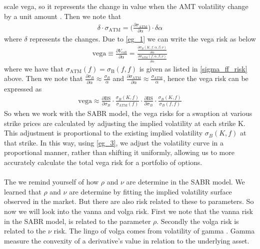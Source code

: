 scale vega, so it represents the change in value when the AMT volatility change by a unit amount \cite{Smile}.
Then we note that 
\begin{align}
    \delta  \cdot \sigma_{\text{ATM}} =
     \Big(\frac{\partial \sigma_{\text{ATM}}}{\partial \alpha} \Big) \cdot \delta \alpha \label{eg_1}
\end{align}
where $\delta$ represents the changes. Due to \autoref{eg_1} we can write the vega risk as below
\begin{align}
    \text{vega} \equiv  \frac{\partial V_{\text{call}}}{\partial \alpha} 
   = \frac{\frac{\partial \sigma_B(K, f; \alpha, \beta, \nu)}{\partial \alpha}}
    {\frac{\partial \sigma_{\text{ATM}}(f; \alpha, \beta, \nu)}{\partial \alpha}} \label{eg_3}
\end{align}
 where we have that $\sigma_{\text{ATM}}(f) = \sigma_{\text{B}} (f,f)$  is given as listed in \autoref{sigma_ff_risk}
 above. 
Then we note that  $\frac{\partial \sigma_B}{\partial \alpha} \approx \frac{ \sigma_B}{ \alpha}$ 
and $\frac{\partial \sigma_{\text{ATM}}}{\partial \alpha} \approx \frac{ \sigma_{\text{ATM}}}{\alpha}$,
hence the vega risk can be expressed as 
\begin{align}
\text{vega} \approx \frac{\partial \text{BS}}{\partial \sigma_B} \cdot
 \frac{\sigma_B(K,f)}{\sigma_{\text{ATM}}(f)} \cdot \frac{\partial \text{BS}}{\partial \sigma_B} 
 \cdot \frac{\sigma_B(K,f)}{\sigma_B(f,f)}
\end{align}
So when we work with the SABR model,
the vega risks for a swaption at various strike prices are calculated by adjusting the implied volatility at each strike 
K. This adjustment is proportional to the existing implied volatility 
$\sigma_B(K,f)$
at that strike. In this way, using \autoref{eg_3}, we adjust the
volatility curve in a proportional manner, rather than shifting 
it uniformly, allowing us to more accurately calculate the total
vega risk for a portfolio of options.
\\\\
The we  remind yourself of how $\rho$ and $\nu$ are determine in the SABR model.
We learned that $\rho$ and $\nu$ are determine by fitting the implied volatility
surface observed in the market. But there are also risk related to these 
to parameters. So now we will look into the vanna and volga risk. 
First we note that the vanna risk in the SABR model, is related 
to the  parameter $\rho$. Secondly the volga risk is related
to the $\nu$ risk. The lingo of volga comes from volatility of gamma
\cite{Smile}. Gamma measure the convexity of a derivative's value in relation to the underlying asset. 
